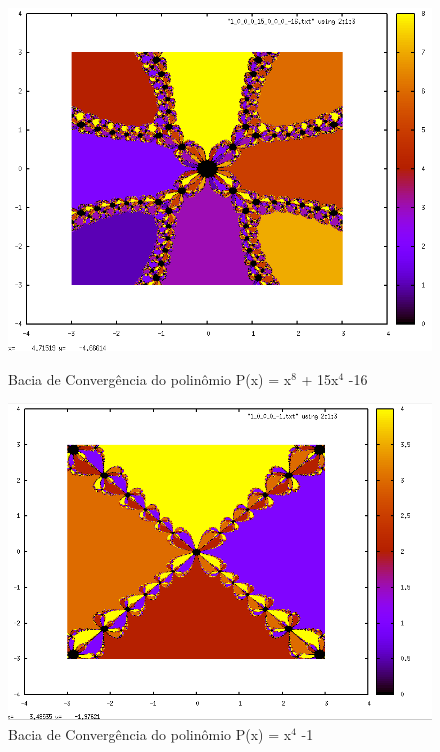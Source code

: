 \documentclass[11pt]{article}
\newcommand{\vsp}{\vspace{0.2in}}
\begin{document}
\begin{figure}[h!]
  \begin{center}
    \includegraphics[scale=0.5]{1}
    \caption{Bacia de Convergência do polinômio P(x) = x$^8$ + 15x$^4$ -16}
    \vsp\vsp
    \includegraphics[scale=0.5]{2}
    \caption{Bacia de Convergência do polinômio P(x) = x$^4$ -1}
  \end{center}
\end{figure}
\end{document}
